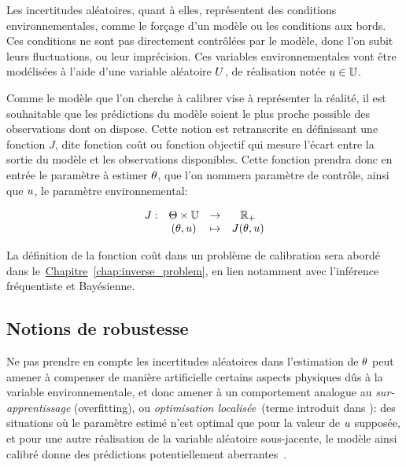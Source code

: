 \documentclass[../../Main_ManuscritThese.tex]{subfiles}
\newcommand{\frchap}[1]{\hyperref[#1]{Chapitre}~\ref{#1}}
\begin{document}
Les incertitudes aléatoires, quant à elles, représentent des
conditions environnementales, comme le forçage d'un modèle ou les
conditions aux bords. Ces conditions ne sont pas directement
contrôlées par le modèle, donc l'on subit leurs fluctuations, ou leur
imprécision. Ces variables environnementales vont être modélisées à
l'aide d'une variable aléatoire $U$, de réalisation notée
$u\in \mathbb{U}$.

Comme le modèle que l'on cherche à calibrer vise à représenter la
réalité, il est souhaitable que les prédictions du modèle soient le
plus proche possible des observations dont on dispose. Cette notion
est retranscrite en définissant une fonction $J$, dite fonction coût
ou fonction objectif qui mesure l'écart entre la sortie du modèle et
les observations disponibles. Cette fonction prendra donc en entrée le
paramètre à estimer $\theta$, que l'on nommera paramètre de contrôle,
ainsi que $u$, le paramètre environnemental:

\begin{equation*}
  \label{eq:def_J}
  \begin{array}{rccc}
   J: & \Theta\times\mathbb{U}& \rightarrow& \mathbb{R}_+ \\
   &(\theta,u)& \mapsto& J(\theta,u)
  \end{array}
\end{equation*}

La définition de la fonction coût dans un problème de calibration sera
abordé dans le~\frchap{chap:inverse_problem}, en lien notamment avec
l'inférence fréquentiste et Bayésienne.

\subsection*{Notions de robustesse}

Ne pas prendre en compte les incertitudes aléatoires dans l'estimation
de $\theta$ peut amener à compenser de manière artificielle certains
aspects physiques dûs à la variable environnementale, et donc amener à
un comportement analogue au \emph{sur-apprentissage} (overfitting), ou
\emph{optimisation localisée}~(terme introduit dans \cite{huyse_probabilistic_2002}): des
situations où le paramètre estimé n'est optimal que pour la valeur de
$u$ supposée, et pour une autre réalisation de la variable aléatoire
sous-jacente, le modèle ainsi calibré donne des prédictions
potentiellement aberrantes~\citep{kuczera_there_2010}.
\end{document}
